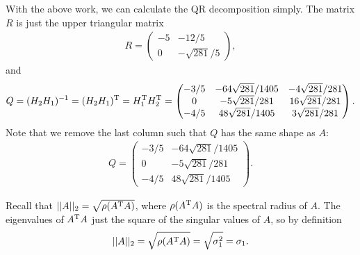 With the above work, we can calculate the QR decomposition simply.
The matrix $R$ is just the upper triangular matrix
\begin{eqnarray}
    \label{eq:R-mat}
    R = \begin{pmatrix}
        -5 & -12/5 \\
        0 & -\sqrt{281}/5
    \end{pmatrix}
,\end{eqnarray}
and 
\begin{eqnarray}
    \label{eq:Q-mat}
    Q = (H_2 H_1)^{-1} = (H_2 H_1)^{\rm T} = H_1^{\rm T} H_2^{\rm T} = \begin{pmatrix}
        -3/5 & -64\sqrt{281}/1405 & -4\sqrt{281}/281 \\
        0 & -5\sqrt{281}/281 & 16\sqrt{281}/281 \\
        -4/5 & 48\sqrt{281}/1405 & 3\sqrt{281}/281
    \end{pmatrix} 
.\end{eqnarray}
Note that we remove the last column such that $Q$ has the same shape as $A$:
\begin{eqnarray}
    \label{eq:Q-mat-proper}
    Q = \begin{pmatrix}
        -3/5 & -64\sqrt{281}/1405 \\
        0 & -5\sqrt{281}/281 \\
        -4/5 & 48\sqrt{281}/1405
    \end{pmatrix} 
.\end{eqnarray}




Recall that $||A||_{2} = \sqrt{\rho(A^{\rm T}A)}$, where $\rho(A^{\rm T}A)$ is the spectral radius of $A$.
The eigenvalues of $A^{\rm T}A$ just the square of the singular values of $A$, so by definition
\begin{eqnarray}
    \label{eq:spectral-radius}
    ||A||_{2} = \sqrt{\rho(A^{\rm T}A)} = \sqrt{\sigma_1^2} = \sigma_1
.\end{eqnarray}

